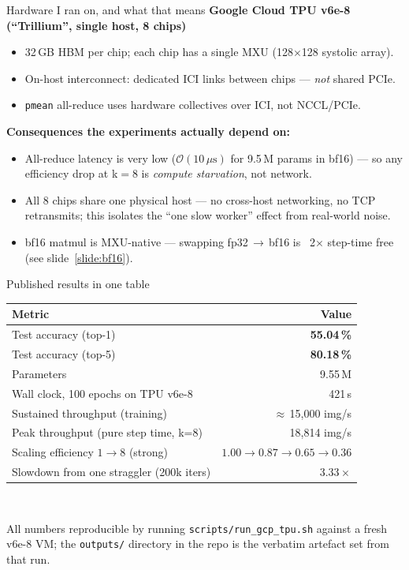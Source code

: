 \documentclass[aspectratio=169,10pt]{beamer}
\begin{document}
\begin{frame}{Hardware I ran on, and what that means}
  \textbf{Google Cloud TPU v6e-8 (``Trillium'', single host, 8 chips)}
  \begin{itemize}
    \item 32\,GB HBM per chip; each chip has a single MXU (128$\times$128 systolic array).
    \item On-host interconnect: dedicated ICI links between chips — \emph{not} shared PCIe.
    \item \texttt{pmean} all-reduce uses hardware collectives over ICI, not NCCL/PCIe.
  \end{itemize}

  \vspace{0.4em}
  \textbf{Consequences the experiments actually depend on:}
  \begin{itemize}
    \item All-reduce latency is very low ($\mathcal{O}(10\,\mu\text{s})$ for 9.5\,M params
          in bf16) — so any efficiency drop at k$=$8 is \emph{compute starvation}, not network.
    \item All 8 chips share one physical host — no cross-host networking, no TCP retransmits;
          this isolates the ``one slow worker'' effect from real-world noise.
    \item bf16 matmul is MXU-native — swapping fp32\,$\to$\,bf16 is ~2$\times$ step-time free
          (see slide~\ref{slide:bf16}).
  \end{itemize}
\end{frame}

\begin{frame}{Published results in one table}
  \centering\small
  \begin{tabular}{@{}lr@{}}\toprule
    \textbf{Metric} & \textbf{Value} \\ \midrule
    Test accuracy (top-1)                     & \textbf{55.04\,\%} \\
    Test accuracy (top-5)                     & \textbf{80.18\,\%} \\
    Parameters                                & 9.55\,M \\
    Wall clock, 100 epochs on TPU v6e-8       & 421\,s \\
    Sustained throughput (training)           & $\approx$\,15{,}000 img/s \\
    Peak throughput (pure step time, k=8)     & 18{,}814 img/s \\
    \midrule
    Scaling efficiency $1\to8$ (strong)       & $1.00\to 0.87\to 0.65\to \mathbf{0.36}$ \\
    Slowdown from one straggler (200k iters)  & $\mathbf{3.33\times}$ \\
    \bottomrule
  \end{tabular}
  \vspace{0.6em}
  \\
  \raggedright\small
  All numbers reproducible by running \texttt{scripts/run\_gcp\_tpu.sh} against a fresh
  v6e-8 VM; the \texttt{outputs/} directory in the repo is the verbatim artefact set
  from that run.
\end{frame}
\end{document}
